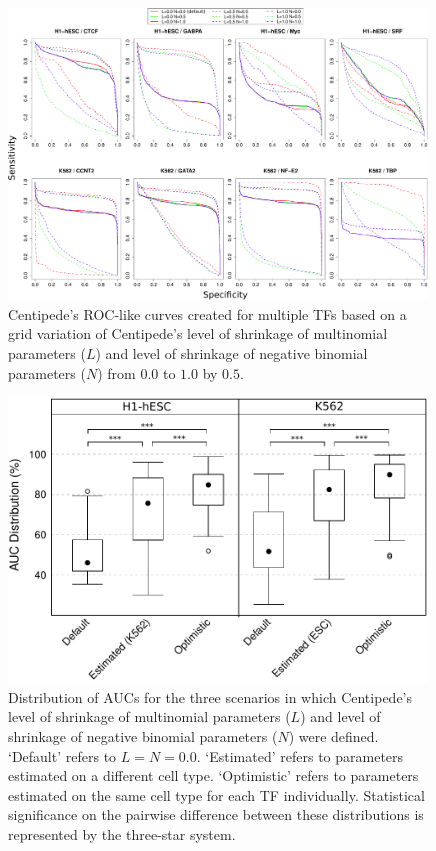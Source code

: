 \documentclass{bioinfo}
\begin{document}
\begin{figure}[t]
\centering
     \includegraphics[width=0.99\textwidth]{Figs/CentipedeTest}
\caption{Centipede's {\color{black} ROC-like} curves created for multiple TFs based on a grid variation of Centipede's level of shrinkage of multinomial parameters ($L$) and level of shrinkage of negative binomial parameters ($N$) from $ 0.0 $ to $ 1.0 $ by $ 0.5 $.}
\label{fig:centipede.test}
\end{figure}

\begin{figure}[t]
\centering
     \includegraphics[width=0.99\textwidth]{Figs/CentipedeTest_Boxplot}
\caption{Distribution of AUCs for the three scenarios in which Centipede's level of shrinkage of multinomial parameters ($L$) and level of shrinkage of negative binomial parameters ($N$) were defined. `Default' refers to $L = N = 0.0$. `Estimated' refers to parameters estimated on a different cell type. `Optimistic' refers to parameters estimated on the same cell type for each TF individually. Statistical significance on the pairwise difference between these distributions is represented by the three-star system.}
\label{fig:centipede.test.box}
\end{figure}
\end{document}
